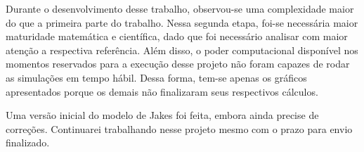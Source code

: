 \documentclass[journal,11pt,twocolumn]{IEEEtran}
\begin{document}
Durante o desenvolvimento desse trabalho, observou-se uma complexidade maior do que a primeira parte do trabalho. Nessa segunda etapa, foi-se necessária maior maturidade matemática e científica, dado que foi necessário analisar com maior atenção a respectiva referência. Além disso, o poder computacional disponível nos momentos reservados para a execução desse projeto não foram capazes de rodar as simulações em tempo hábil. Dessa forma, tem-se apenas os gráficos apresentados porque os demais não finalizaram seus respectivos cálculos.

Uma versão inicial do modelo de Jakes foi feita, embora ainda precise de correções. Continuarei trabalhando nesse projeto mesmo com o prazo para envio finalizado.



\end{document}
